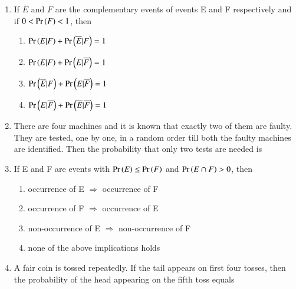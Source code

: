 \documentclass[journal,12pt,onecolumn,article]{IEEEtran}
\theoremstyle{remark}
\begin{document}
\begin{enumerate}[start=3]
\begin{enumerate}
\end{enumerate}
\item If $\overline{E}$ and $\overline{F}$ are the complementary events of events E and F respectively and if $0<\Pr\left(F\right)<1$, then
\hfill{}
\begin{enumerate}
\item $\Pr\left(E|F\right)+\Pr\left(\overline{E}|F\right)=1$
\item $\Pr\left(E|F\right)+\Pr\left(E|\overline{F}\right)=1$
\item $\Pr\left(\overline{E}|F\right)+\Pr\left(E|\overline{F}\right)=1$
\item $\Pr\left(E|\overline{F}\right)+\Pr\left(\overline{E}|\overline{F}\right)=1$
\end{enumerate}
\item There are four machines and it is known that exactly two of them are faulty. They are tested, one by one, in a random order till both the faulty machines are identified. Then the probability that only two tests are needed is
\hfill{}
\begin{enumerate}
\end{enumerate}
\item If E and F are events with $\Pr\left(E\right) \leq \Pr\left(F\right)$ and $\Pr\left(E\cap F\right)>0$, then
\hfill{}
\begin{enumerate}
\item occurrence of E $\Rightarrow$ occurrence of F
\item occurrence of F $\Rightarrow$ occurrence of E
\item non-occurrence of E $\Rightarrow$ non-occurrence of F
\item none of the above implications holds
\end{enumerate}
\item A fair coin is tossed repeatedly. If the tail appears on first four tosses, then the probability of the head appearing on the fifth toss equals
\hfill{}
\begin{enumerate}
\begin{multicols}{4}

\end{multicols}
\end{enumerate}
\end{enumerate}
\end{document}
